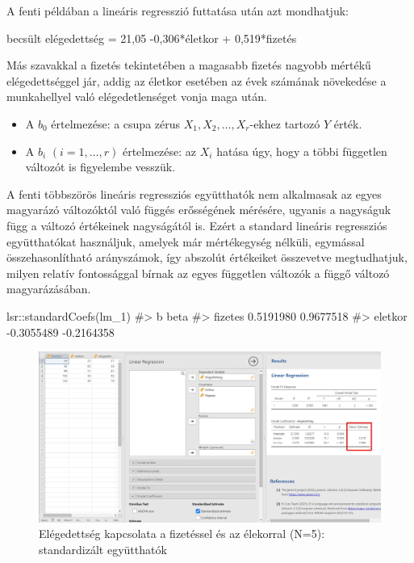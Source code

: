\documentclass[
  letterpaper,
]{krantz}
\makeatletter
\newenvironment{Shaded}{\begin{snugshade}}{\end{snugshade}}
\newcommand{\CommentTok}[1]{\textcolor[rgb]{0.37,0.37,0.37}{#1}}
\newcommand{\FunctionTok}[1]{\textcolor[rgb]{0.28,0.35,0.67}{#1}}
\newcommand{\NormalTok}[1]{\textcolor[rgb]{0.00,0.23,0.31}{#1}}
\newcommand{\SpecialCharTok}[1]{\textcolor[rgb]{0.37,0.37,0.37}{#1}}
\providecommand{\tightlist}{%
  \setlength{\itemsep}{0pt}\setlength{\parskip}{0pt}}\usepackage{longtable,booktabs,array}
\newenvironment{kframe}{%
\medskip{}
\setlength{\fboxsep}{.8em}
 \def\at@end@of@kframe{}%
 \ifinner\ifhmode%
  \def\at@end@of@kframe{\end{minipage}}%
  \begin{minipage}{\columnwidth}%
 \fi\fi%
 \def\FrameCommand##1{\hskip\@totalleftmargin \hskip-\fboxsep
 \colorbox{shadecolor}{##1}\hskip-\fboxsep
     \hskip-\linewidth \hskip-\@totalleftmargin \hskip\columnwidth}%
 \MakeFramed {\advance\hsize-\width
   \@totalleftmargin\z@ \linewidth\hsize
   \@setminipage}}%
 {\par\unskip\endMakeFramed%
 \at@end@of@kframe}
\renewenvironment{Shaded}{\begin{kframe}}{\end{kframe}}
\makeatother
\begin{document}
A fenti példában a lineáris regresszió futtatása után azt mondhatjuk:

\begin{Shaded}
\begin{Highlighting}[]
\NormalTok{becsült elégedettség = 21,05 {-}0,306*életkor + 0,519*fizetés}
\end{Highlighting}
\end{Shaded}

Más szavakkal a fizetés tekintetében a magasabb fizetés nagyobb mértékű
elégedettséggel jár, addig az életkor esetében az évek számának
növekedése a munkahellyel való elégedetlenséget vonja maga után.

\begin{itemize}
\tightlist
\item
  A \(b_0\) értelmezése: a csupa zérus \(X_1, X_2,\dots,X_r\)-ekhez
  tartozó \(Y\) érték.
\item
  A \(b_i\) \((i=1,\dots,r)\) értelmezése: az \(X_i\) hatása úgy, hogy a
  többi független változót is figyelembe vesszük.
\end{itemize}

A fenti többszörös lineáris regressziós együtthatók nem alkalmasak az
egyes magyarázó változóktól való függés erősségének mérésére, ugyanis a
nagyságuk függ a változó értékeinek nagyságától is. Ezért a standard
lineáris regressziós együtthatókat használjuk, amelyek már mértékegység
nélküli, egymással összehasonlítható arányszámok, így abszolút
értékeiket összevetve megtudhatjuk, milyen relatív fontossággal bírnak
az egyes független változók a függő változó magyarázásában.

\begin{Shaded}
\begin{Highlighting}[]
\NormalTok{lsr}\SpecialCharTok{::}\FunctionTok{standardCoefs}\NormalTok{(lm\_1)}
\CommentTok{\#\textgreater{}                  b       beta}
\CommentTok{\#\textgreater{} fizetes  0.5191980  0.9677518}
\CommentTok{\#\textgreater{} eletkor {-}0.3055489 {-}0.2164358}
\end{Highlighting}
\end{Shaded}

\begin{figure}

{\centering \includegraphics{./images/lin_reg_fizetes_eletkor_elegedettseg_01_kep_02.jpg}

}

\caption{Elégedettség kapcsolata a fizetéssel és az élekorral (N=5):
standardizált együtthatók}

\end{figure}
\end{document}
